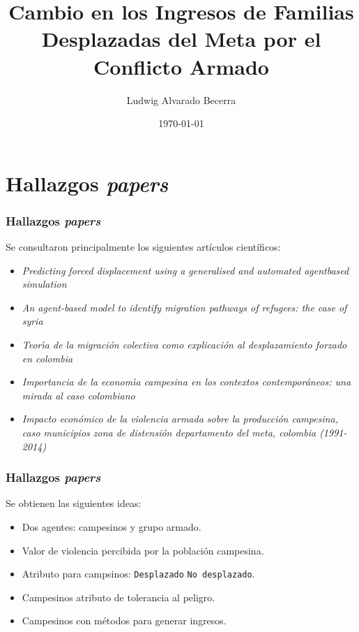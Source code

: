 \documentclass[17pt, t, lualatex]{beamer}
\title{\LARGE Cambio en los Ingresos de Familias Desplazadas del Meta por el Conflicto Armado}
\date{\today}
\institute[UJTL]{Universidad Jorge Tadeo Lozano}
\author{Ludwig Alvarado Becerra}
\begin{document}
\inserttitlepage

\section{Hallazgos \textit{papers}}

\insertsectionpage

\begin{frame}[allowframebreaks]
  \frametitle{Hallazgos \textit{papers}}
  Se consultaron principalmente los siguientes artículos científicos:
  \begin{itemize}
    \item \textit{Predicting forced displacement using a generalised and automated agentbased simulation} \cite{suleimenova2020predicting}
    \item \textit{An agent-based model to identify migration pathways of refugees: the case of syria} \cite{hebert2017agent}
    \item \textit{Teorı́a de la migración colectiva como explicación al desplazamiento forzado en colombia} \cite{Gutierrez2012}
    \item \textit{Importancia de la economı́a campesina en los contextos contemporáneos: una mirada al caso colombiano}\cite{santacoloma2015importancia}
    \item \textit{Impacto económico de la violencia armada sobre la producción campesina, caso municipios zona de distensión departamento del meta, colombia (1991-2014)} \cite{perez2016impacto}
  \end{itemize}

\end{frame}

\begin{frame}[allowframebreaks]
  \frametitle{Hallazgos \textit{papers}}
  Se obtienen las siguientes ideas:
  \begin{itemize}
    \item Dos agentes: campesinos y grupo armado.
    \item Valor de violencia percibida por la población campesina.
    \item Atributo para campsinos: \texttt{Desplazado} \texttt{No desplazado}.
    \item Campesinos atributo de tolerancia al peligro.
    \item Campesinos con métodos para generar ingresos.
  \end{itemize}
\end{frame}
\end{document}

